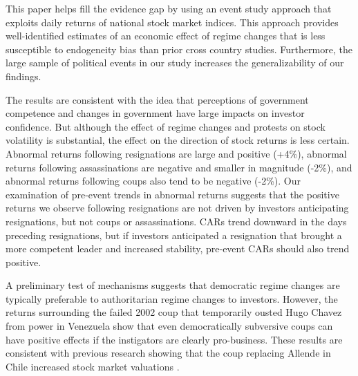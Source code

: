 \documentclass[12pt,final,fleqn]{article}
\theoremstyle{plain}
\begin{document}
This paper helps fill the evidence gap by using an event study approach that exploits daily returns of national stock market indices. This approach provides well-identified estimates of an economic effect of regime changes that is less susceptible to endogeneity bias than prior cross country studies. Furthermore, the large sample of political events in our study increases the generalizability of our findings.  

The results are consistent with the idea that perceptions of government competence and changes in government have large impacts on investor confidence. But although the effect of regime changes and protests on stock volatility is substantial, the effect on the direction of stock returns is less certain. Abnormal returns following resignations are large and positive (+4\%), abnormal returns following assassinations are negative and smaller in magnitude (-2\%), and abnormal returns following coups also tend to be negative (-2\%). Our examination of pre-event trends in abnormal returns suggests that the positive returns we observe following resignations are not driven by investors anticipating resignations, but not coups or assassinations. CARs trend downward in the days preceding resignations, but if investors anticipated a resignation that brought a more competent leader and increased stability, pre-event CARs should also trend positive. 

A preliminary test of mechanisms suggests that democratic regime changes are typically preferable to authoritarian regime changes to investors. However, the returns surrounding the failed 2002 coup that temporarily ousted Hugo Chavez from power in Venezuela show that even democratically subversive coups can have positive effects if the instigators are clearly pro-business. These results are consistent with previous research showing that the coup replacing Allende in Chile increased stock market valuations \citep{girardi2018institution}. 
\end{document}
